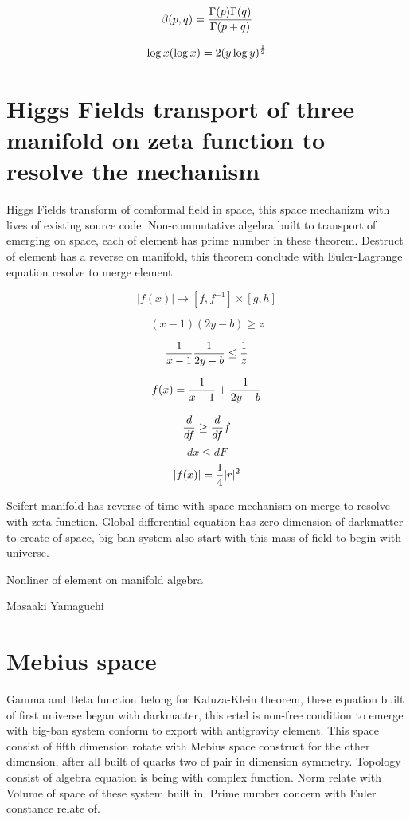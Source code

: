 \documentclass{jsarticle}
\begin{document}
$$ \beta (p,q) = {\Gamma(p) \Gamma(q) \over \Gamma(p + q)} $$

	$$ \log x(\log x) = 2 (y \log y)^{1 \over 2} $$
\section{Higgs Fields transport of three manifold on zeta function to resolve the mechanism}

  Higgs Fields transform of comformal field in space, this space mechanizm with lives of existing source code.
Non-commutative algebra built to transport of emerging on space, each of element has prime number in these theorem.
Destruct of element has a reverse on manifold, this theorem conclude with Euler-Lagrange equation resolve
to merge element.

$$ |f(x)| \to [f, f^{-1}] \times [g, h] $$ 

$$ (x - 1)(2y - b) \ge z $$

$$ {1 \over x - 1}{1 \over 2y - b} \le {1 \over z} $$

$$ f(x) = {1 \over x - 1} + {1 \over 2y - b} $$

$$ {d \over df} \ge {d \over df}f $$
$$ dx \le dF $$
$$ |f(x)| = {1 \over 4}|r|^2$$

  Seifert manifold has reverse of time with space mechanism on merge to resolve with zeta function. Global
differential equation has zero dimension of darkmatter to create of space, big-ban system also start with
this mass of field to begin with universe.

\newpage
\begin{center}
\large	Nonliner of element on manifold algebra
\end{center}
\begin{center}
	Masaaki Yamaguchi
\end{center}




\section{Mebius space}

  Gamma and Beta function belong for Kaluza-Klein theorem, these equation built of first universe
began with darkmatter, this ertel is non-free condition to emerge with big-ban system conform to
export with antigravity element. This space consist of fifth dimension rotate with Mebius space
construct for the other dimension, after all built of quarks two of pair in dimension symmetry.
Topology consist of algebra equation is being with complex function. Norm relate with Volume of space
of these system built in. Prime number concern with Euler constance relate of.
\end{document}
